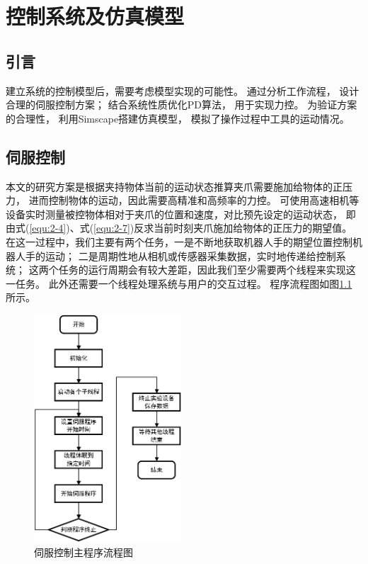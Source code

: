 \chapter{控制系统及仿真模型}

\section{引言}
建立系统的控制模型后，需要考虑模型实现的可能性。
通过分析工作流程， 设计合理的伺服控制方案； 结合系统性质优化PD算法， 用于实现力控。
为验证方案的合理性， 利用Simscape搭建仿真模型， 模拟了操作过程中工具的运动情况。

\section{伺服控制}
本文的研究方案是根据夹持物体当前的运动状态推算夹爪需要施加给物体的正压力，
进而控制物体的运动，因此需要高精准和高频率的力控。
可使用高速相机等设备实时测量被控物体相对于夹爪的位置和速度，对比预先设定的运动状态，
即由式(\ref{equ:2-4})、式(\ref{equ:2-7})反求当前时刻夹爪施加给物体的正压力的期望值。
在这一过程中，我们主要有两个任务，一是不断地获取机器人手的期望位置控制机器人手的运动；
二是周期性地从相机或传感器采集数据，实时地传递给控制系统；
这两个任务的运行周期会有较大差距，因此我们至少需要两个线程来实现这一任务。
此外还需要一个线程处理系统与用户的交互过程。
程序流程图如图\ref{fig:3-1} 所示。

\begin{figure}[!ht]
  \centering
  \includegraphics[width=5.5cm]{chapter03/pic/3-1}
  \caption{伺服控制主程序流程图\label{fig:3-1}}
  \vspace{-0.3cm}
\end{figure}

